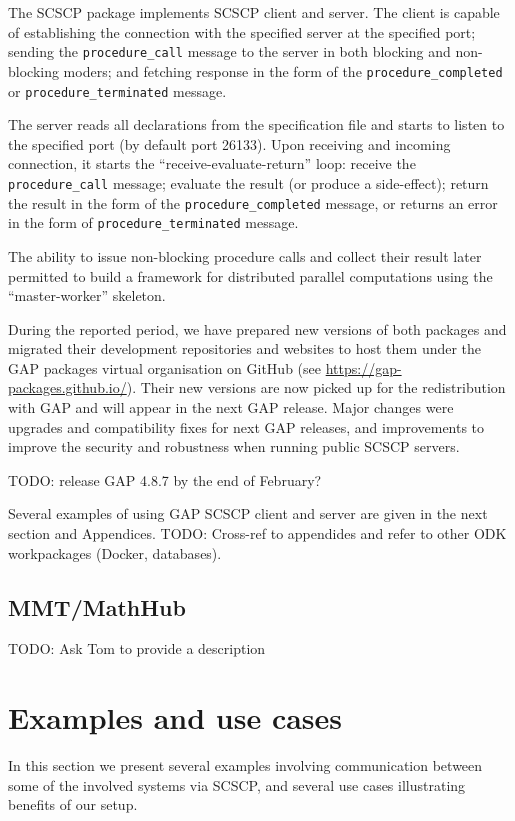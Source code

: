 \documentclass{deliverablereport}
\begin{document}
The SCSCP package implements SCSCP client and server. 
The client is capable of establishing the connection with the specified server
at the specified port; sending the {\tt procedure\_call} message to
the server in both blocking and non-blocking moders; and fetching
response in the form of the {\tt procedure\_completed} or
{\tt procedure\_terminated} message. 

The server reads all declarations from the specification file and starts
to listen to the specified port (by default port 26133). Upon receiving 
and incoming connection, it starts the ``receive-evaluate-return'' loop:
receive the {\tt procedure\_call} message; evaluate the result 
(or produce a side-effect); return the result in the form of the
{\tt procedure\_completed} message, or returns an error in the form
of {\tt procedure\_terminated} message.

The ability to issue non-blocking procedure calls and collect their result
later permitted to build a framework for distributed parallel computations
using the ``master-worker'' skeleton.

During the reported period, we have prepared new versions of 
both packages and migrated their development repositories and
websites to host them under the GAP packages virtual organisation 
on GitHub (see \url{https://gap-packages.github.io/}).
Their new versions are now picked up for the redistribution
with GAP and will appear in the next GAP release. Major changes
were upgrades and compatibility fixes for next GAP releases, 
and improvements to improve the security and robustness when
running public SCSCP servers. 

TODO: release GAP 4.8.7 by the end of February?

Several examples of using GAP SCSCP client and server are given
in the next section and Appendices. TODO: Cross-ref to appendides
and refer to other ODK workpackages (Docker, databases).


\subsection{MMT/MathHub}

TODO: Ask Tom to provide a description


\section{Examples and use cases}\label{examples}

In this section we present several examples 
involving communication between some of the
involved systems via SCSCP, and several use
cases illustrating benefits of our setup.
\end{document}
